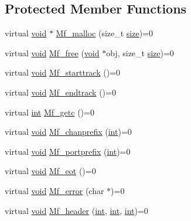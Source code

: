 \subsection*{Protected Member Functions}
\begin{DoxyCompactItemize}
\item 
virtual \hyperlink{sound_8c_ae35f5844602719cf66324f4de2a658b3}{void} $\ast$ \hyperlink{class_midifile__reader_a3d2ff226a4b556bc00ad1cba57609124}{Mf\+\_\+malloc} (size\+\_\+t \hyperlink{group__lavu__mem_ga854352f53b148adc24983a58a1866d66}{size})=0
\item 
virtual \hyperlink{sound_8c_ae35f5844602719cf66324f4de2a658b3}{void} \hyperlink{class_midifile__reader_a38cc86a45db65128141fc27d474ec65e}{Mf\+\_\+free} (\hyperlink{sound_8c_ae35f5844602719cf66324f4de2a658b3}{void} $\ast$obj, size\+\_\+t \hyperlink{group__lavu__mem_ga854352f53b148adc24983a58a1866d66}{size})=0
\item 
virtual \hyperlink{sound_8c_ae35f5844602719cf66324f4de2a658b3}{void} \hyperlink{class_midifile__reader_adaa245a7a8c96dcf65996c4e1a8c131b}{Mf\+\_\+starttrack} ()=0
\item 
virtual \hyperlink{sound_8c_ae35f5844602719cf66324f4de2a658b3}{void} \hyperlink{class_midifile__reader_aec0b43878889ed8ea5dca25b03df9624}{Mf\+\_\+endtrack} ()=0
\item 
virtual \hyperlink{xmltok_8h_a5a0d4a5641ce434f1d23533f2b2e6653}{int} \hyperlink{class_midifile__reader_aa4800df57c6c2afef6d6de50a16b676a}{Mf\+\_\+getc} ()=0
\item 
virtual \hyperlink{sound_8c_ae35f5844602719cf66324f4de2a658b3}{void} \hyperlink{class_midifile__reader_a04a66c6e006591413f7752296338cefe}{Mf\+\_\+chanprefix} (\hyperlink{xmltok_8h_a5a0d4a5641ce434f1d23533f2b2e6653}{int})=0
\item 
virtual \hyperlink{sound_8c_ae35f5844602719cf66324f4de2a658b3}{void} \hyperlink{class_midifile__reader_a4f370d45874c1ca81e8b11e2e25b4d6f}{Mf\+\_\+portprefix} (\hyperlink{xmltok_8h_a5a0d4a5641ce434f1d23533f2b2e6653}{int})=0
\item 
virtual \hyperlink{sound_8c_ae35f5844602719cf66324f4de2a658b3}{void} \hyperlink{class_midifile__reader_aac29212ceacfc457ac2f0997570c67ed}{Mf\+\_\+eot} ()=0
\item 
virtual \hyperlink{sound_8c_ae35f5844602719cf66324f4de2a658b3}{void} \hyperlink{class_midifile__reader_a1f6ea6c516d0ce72d5ab9692eec99776}{Mf\+\_\+error} (char $\ast$)=0
\item 
virtual \hyperlink{sound_8c_ae35f5844602719cf66324f4de2a658b3}{void} \hyperlink{class_midifile__reader_acf22e8d684c544d5ccdf6603d2d468ee}{Mf\+\_\+header} (\hyperlink{xmltok_8h_a5a0d4a5641ce434f1d23533f2b2e6653}{int}, \hyperlink{xmltok_8h_a5a0d4a5641ce434f1d23533f2b2e6653}{int}, \hyperlink{xmltok_8h_a5a0d4a5641ce434f1d23533f2b2e6653}{int})=0

\end{DoxyCompactItemize}
